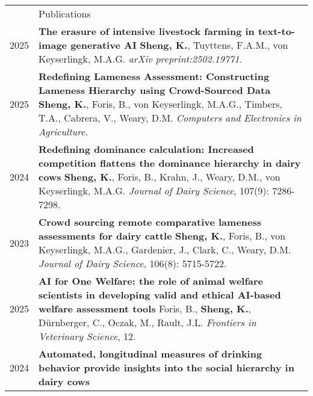 \documentclass[letterpaper, 11pt]{article}
\newcommand{\headingfont}{\Large\color{OliveGreen}}
\newenvironment{SectionTable}[1]{
	\renewcommand*{\arraystretch}{1.7}
	\setlength{\tabcolsep}{10pt}
	\begin{longtable}{Rp{5.2in}} & #1 \\}
{\end{longtable}\vspace{-.3cm}}
\begin{document}
\begin{SectionTable}{\headingfont Publications}
2025 & 
\textbf{{The erasure of intensive livestock farming in text-to-image generative AI}} \newline
\textbf{Sheng, K.}, Tuyttens, F.A.M., von Keyserlingk, M.A.G. \newline
\textit{arXiv preprint:2502.19771. }  \\
2025 &
\textbf{{Redefining Lameness Assessment: Constructing Lameness Hierarchy using Crowd-Sourced Data}} \newline
\textbf{Sheng, K.}, Foris, B., von Keyserlingk, M.A.G., Timbers, T.A., Cabrera, V., Weary, D.M. \newline
\textit{Computers and Electronics in Agriculture. }\\
2024 & 
\textbf{{Redefining dominance calculation: Increased competition flattens the dominance hierarchy in dairy cows}} \newline
\textbf{Sheng, K.}, Foris, B., Krahn, J., Weary, D.M., von Keyserlingk, M.A.G. \newline
\textit{Journal of Dairy Science}, 107(9): 7286-7298.  \\
2023 & 
\textbf{{Crowd sourcing remote comparative lameness assessments for dairy cattle}} \newline
\textbf{Sheng, K.}, Foris, B., von Keyserlingk, M.A.G., Gardenier, J., Clark, C., Weary, D.M. \newline
\textit{Journal of Dairy Science}, 106(8): 5715-5722. \\
2025 & 
\textbf{{AI for One Welfare: the role of animal welfare scientists in developing valid and ethical AI-based welfare assessment tools}} \newline
Foris, B., \textbf{Sheng, K.}, Dürnberger, C., Oczak, M., Rault, J.L. \newline
\textit{Frontiers in Veterinary Science}, 12. \\
2024 & 
\textbf{{Automated, longitudinal measures of drinking behavior provide insights into the social hierarchy in dairy cows}} \newline

\end{SectionTable}
\end{document}
